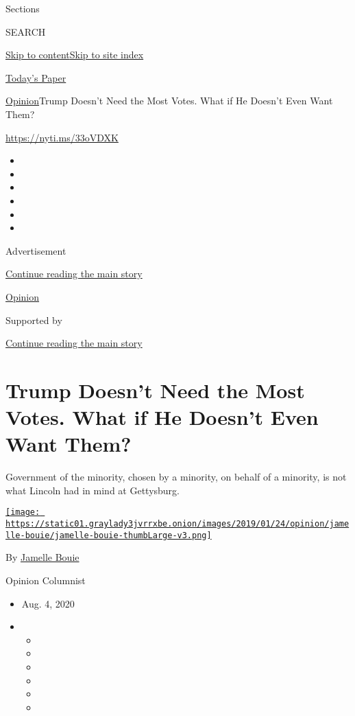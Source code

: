 Sections

SEARCH

\protect\hyperlink{site-content}{Skip to
content}\protect\hyperlink{site-index}{Skip to site index}

\href{https://myaccount.nytimes3xbfgragh.onion/auth/login?response_type=cookie\&client_id=vi}{}

\href{https://www.nytimes3xbfgragh.onion/section/todayspaper}{Today's
Paper}

\href{/section/opinion}{Opinion}\textbar{}Trump Doesn't Need the Most
Votes. What if He Doesn't Even Want Them?

\url{https://nyti.ms/33oVDXK}

\begin{itemize}
\item
\item
\item
\item
\item
\item
\end{itemize}

Advertisement

\protect\hyperlink{after-top}{Continue reading the main story}

\href{/section/opinion}{Opinion}

Supported by

\protect\hyperlink{after-sponsor}{Continue reading the main story}

\hypertarget{trump-doesnt-need-the-most-votes-what-if-he-doesnt-even-want-them}{%
\section{Trump Doesn't Need the Most Votes. What if He Doesn't Even Want
Them?}\label{trump-doesnt-need-the-most-votes-what-if-he-doesnt-even-want-them}}

Government of the minority, chosen by a minority, on behalf of a
minority, is not what Lincoln had in mind at Gettysburg.

\href{https://www.nytimes3xbfgragh.onion/column/jamelle-bouie}{\texttt{[image: https://static01.graylady3jvrrxbe.onion/images/2019/01/24/opinion/jamelle-bouie/jamelle-bouie-thumbLarge-v3.png]}}

By
\href{https://www.nytimes3xbfgragh.onion/column/jamelle-bouie}{Jamelle
Bouie}

Opinion Columnist

\begin{itemize}
\item
  Aug. 4, 2020
\item
  \begin{itemize}
  \item
  \item
  \item
  \item
  \item
  \item
  \end{itemize}
\end{itemize}

